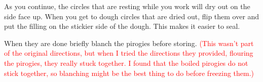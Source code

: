 \documentclass[11pt]{article}
\begin{document}
As you continue, the circles that are resting while you work will dry out on the side face up.  When you get to dough circles that are dried out, flip them over and put the filling on the stickier side of the dough.  This makes it easier to seal.

When they are done briefly blanch the pirogies before storing. \textcolor{red}{(This wasn't part of the original directions, but when I tried the directions they provided, flouring the pirogies, they really stuck together.  I found that the boiled pirogies do not stick together, so blanching might be the best thing to do before freezing them.)}
\end{document}

